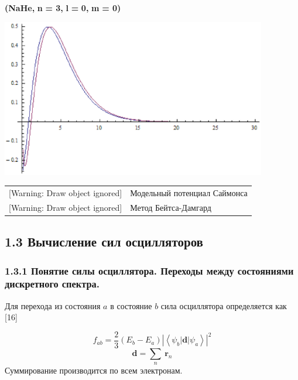 \bigskip

\textbf{(}\foreignlanguage{english}{\textbf{NaHe}}\textbf{, }\foreignlanguage{english}{\textbf{n}}\textbf{ = 3,
}\foreignlanguage{english}{\textbf{l}}\textbf{ = }\foreignlanguage{english}{\textbf{0}}\textbf{,
}\foreignlanguage{english}{\textbf{m}}\textbf{ = 0)}

\includegraphics[width=11.592cm,height=6.904cm]{chervinskaya-15.eps}



\begin{tabular}{m{3.741cm}m{12.927cm}}
[Warning: Draw object ignored] &
Модельный потенциал
Саймонса\\
{}[Warning: Draw object ignored] &
Метод
Бейтса-Дамгард\\
\end{tabular}

\clearpage\subsection[1.3 Вычисление
сил осцилляторов]{1.3
Вычисление сил
осцилляторов}
\subsubsection[1.3.1 Понятие
силы осциллятора. Переходы между состояниями дискретного
спектра.]{1.3.1 Понятие
силы осциллятора. Переходы между состояниями дискретного
спектра.}
Для перехода
из состояния $a$
в состояние $b$
сила осциллятора
определяется как [16]

\begin{equation*}
	f_{ab}=
	\frac{2}{3}\left( E_b-E_a \right) \left| \left< \psi_b |\textbf{d}| \psi_a \right> \right|^2
\end{equation*}
\begin{equation*}
{\textbf{d}} = \sum _n\ \textbf{r}_n
\end{equation*}
Суммирование производится по всем электронам.

